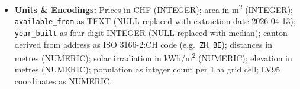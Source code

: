 \documentclass[11pt, a4paper]{article}
\begin{document}
\begin{itemize}
\begin{itemize}
    \end{itemize}
    \item \textbf{Units \& Encodings:} Prices in CHF (INTEGER); area in m\textsuperscript{2} (INTEGER); \texttt{available\_from} as TEXT (NULL replaced with extraction date 2026-04-13); \texttt{year\_built} as four-digit INTEGER (NULL replaced with median); canton derived from address as ISO 3166-2:CH code (e.g.\ \texttt{ZH}, \texttt{BE}); distances in metres (NUMERIC); solar irradiation in kWh/m\textsuperscript{2} (NUMERIC); elevation in metres (NUMERIC); population as integer count per 1\,ha grid cell; LV95 coordinates as NUMERIC.
\end{itemize}
\end{document}

